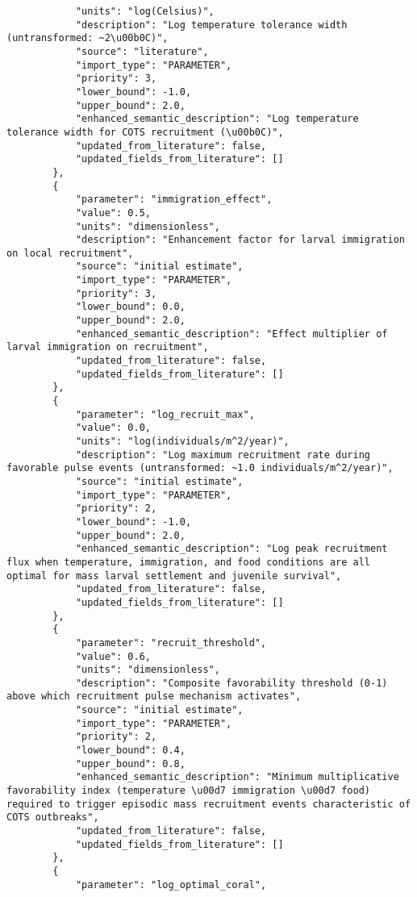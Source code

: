\begin{lstlisting}
            "units": "log(Celsius)",
            "description": "Log temperature tolerance width (untransformed: ~2\u00b0C)",
            "source": "literature",
            "import_type": "PARAMETER",
            "priority": 3,
            "lower_bound": -1.0,
            "upper_bound": 2.0,
            "enhanced_semantic_description": "Log temperature tolerance width for COTS recruitment (\u00b0C)",
            "updated_from_literature": false,
            "updated_fields_from_literature": []
        },
        {
            "parameter": "immigration_effect",
            "value": 0.5,
            "units": "dimensionless",
            "description": "Enhancement factor for larval immigration on local recruitment",
            "source": "initial estimate",
            "import_type": "PARAMETER",
            "priority": 3,
            "lower_bound": 0.0,
            "upper_bound": 2.0,
            "enhanced_semantic_description": "Effect multiplier of larval immigration on recruitment",
            "updated_from_literature": false,
            "updated_fields_from_literature": []
        },
        {
            "parameter": "log_recruit_max",
            "value": 0.0,
            "units": "log(individuals/m^2/year)",
            "description": "Log maximum recruitment rate during favorable pulse events (untransformed: ~1.0 individuals/m^2/year)",
            "source": "initial estimate",
            "import_type": "PARAMETER",
            "priority": 2,
            "lower_bound": -1.0,
            "upper_bound": 2.0,
            "enhanced_semantic_description": "Log peak recruitment flux when temperature, immigration, and food conditions are all optimal for mass larval settlement and juvenile survival",
            "updated_from_literature": false,
            "updated_fields_from_literature": []
        },
        {
            "parameter": "recruit_threshold",
            "value": 0.6,
            "units": "dimensionless",
            "description": "Composite favorability threshold (0-1) above which recruitment pulse mechanism activates",
            "source": "initial estimate",
            "import_type": "PARAMETER",
            "priority": 2,
            "lower_bound": 0.4,
            "upper_bound": 0.8,
            "enhanced_semantic_description": "Minimum multiplicative favorability index (temperature \u00d7 immigration \u00d7 food) required to trigger episodic mass recruitment events characteristic of COTS outbreaks",
            "updated_from_literature": false,
            "updated_fields_from_literature": []
        },
        {
            "parameter": "log_optimal_coral",

\end{lstlisting}

